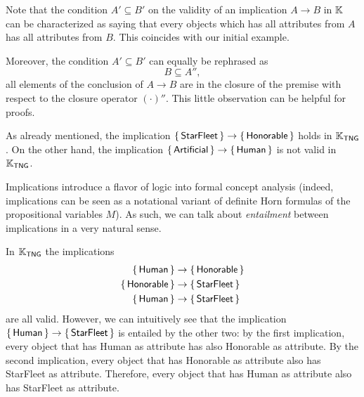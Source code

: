 Note that the condition $A' \subseteq B'$ on the validity of an implication $A \to B$ in
${\mathbb{K}}$ can be characterized as saying that every objects which has all attributes from
$A$ has all attributes from $B$.  This coincides with our initial example.

Moreover, the condition $A' \subseteq B'$ can equally be rephrased as
\begin{equation}
  \label{eq:6}
  B \subseteq A'',
\end{equation}
\ie all elements of the conclusion of $A \to B$ are in the closure of the premise with
respect to the closure operator $(\cdot)''$.  This little observation can be helpful for
proofs.

\begin{Example}
  \label{expl:6}
  As already mentioned, the implication ${\{\, \mathsf{StarFleet} \,\}} \to {\ensuremath{\{\,
    \mathsf{Honorable} \,\}}}$ holds in ${\mathbb{K}}_{\mathsf{TNG}}$.  On the other hand, the
  implication ${\{\, \mathsf{Artificial} \,\}} \to {\ensuremath{\{\, \mathsf{Human} \,\}}}$ is not valid in
  ${\mathbb{K}}_{\mathsf{TNG}}$.
\end{Example}

Implications introduce a flavor of logic into formal concept analysis (indeed,
implications can be seen as a notational variant of definite Horn formulas of the
propositional variables $M$).  As such, we can talk about \emph{entailment} between
implications in a very natural sense.

\begin{Example}
  \label{expl:7}
  In ${\mathbb{K}}_{\mathsf{TNG}}$ the implications
  \begin{align*}
    {\ensuremath{\{\, \mathsf{Human} \,\}}} &\to {\ensuremath{\{\, \mathsf{Honorable} \,\}}} \\
    {\{\, \mathsf{Honorable} \,\}} &\to {\ensuremath{\{\, \mathsf{StarFleet} \,\}}} \\
    {\{\, \mathsf{Human} \,\}} &\to {\ensuremath{\{\, \mathsf{StarFleet} \,\}}}
  \end{align*}
  are all valid.  However, we can intuitively see that the implication ${\{\,
    \mathsf{Human} \,\}} \to {\ensuremath{\{\, \mathsf{StarFleet} \,\}}}$ is entailed by the other two: by the
  first implication, every object that has \textsf{Human} as attribute has also
  \textsf{Honorable} as attribute.  By the second implication, every object that has
  \textsf{Honorable} as attribute also has \textsf{StarFleet} as attribute.  Therefore,
  every object that has \textsf{Human} as attribute also has \textsf{StarFleet} as
  attribute.
\end{Example}

